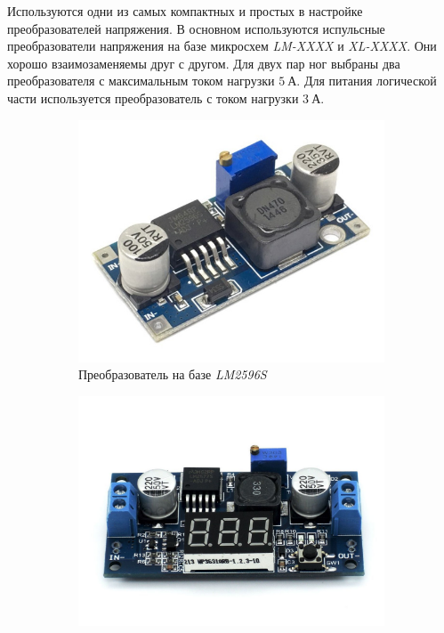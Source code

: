 

Используются одни из самых компактных и простых в настройке преобразователей напряжения. В основном используются испульсные преобразователи напряжения на базе микросхем \textit{LM-XXXX} и \textit{XL-XXXX}. Они хорошо взаимозаменяемы друг с другом. Для двух пар ног выбраны два преобразователя с максимальным током нагрузки $ 5 \: А $. Для питания логической части используется преобразователь с током нагрузки $ 3 \: А $.
\begin{figure}[ht]
    \centering
    \begin{subfigure}[b]{0.45\textwidth}    
        \centering
        \includegraphics[scale=0.30]{chapter_mechanics_construction/figure4.jpg}
        \caption{Преобразователь на базе \textit{LM2596S}}
    \end{subfigure}
    \begin{subfigure}[b]{0.45\textwidth}
        \centering
        \includegraphics[scale=0.15]{chapter_mechanics_construction/figure5.jpg}

\end{subfigure}
\end{figure}
